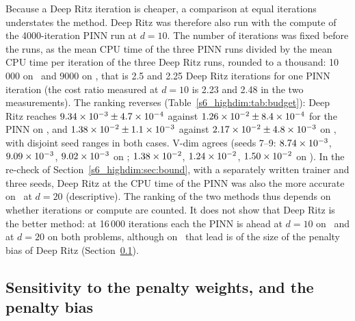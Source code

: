 Because a Deep Ritz iteration is cheaper, a comparison at equal iterations understates the
method. Deep Ritz was therefore also run with the compute of the 4000-iteration PINN run
at $d=10$.
The number of iterations was fixed before the runs, as the mean CPU time of the three PINN runs
divided by the mean CPU time per iteration of the three Deep Ritz runs, rounded to a thousand:
10\,000 on \Pone\ and 9000 on \Ptwo, that is 2.5 and 2.25 Deep Ritz iterations for one PINN
iteration (the cost ratio measured at $d=10$ is 2.23 and 2.48 in the two measurements).
The ranking reverses (Table~\ref{s6_highdim:tab:budget}): Deep Ritz reaches
$9.34\times 10^{-3}\pm4.7\times 10^{-4}$ against $1.26\times 10^{-2}\pm8.4\times 10^{-4}$ for the PINN on
\Pone, and $1.38\times 10^{-2}\pm1.1\times 10^{-3}$ against $2.17\times 10^{-2}\pm4.8\times 10^{-3}$ on \Ptwo,
with disjoint seed ranges in both cases. \textsf{V-dim} agrees (seeds 7--9:
$8.74\times 10^{-3}$, $9.09\times 10^{-3}$, $9.02\times 10^{-3}$ on \Pone; $1.38\times 10^{-2}$,
$1.24\times 10^{-2}$, $1.50\times 10^{-2}$ on \Ptwo). In the re-check of
Section~\ref{s6_highdim:sec:bound}, with a separately written trainer and three seeds, Deep Ritz
at the CPU time of the PINN was also the more accurate on \Pone\ at $d=20$ (descriptive).
The ranking of the two methods thus depends on whether iterations or compute are counted. It
does not show that Deep Ritz is the better method: at 16\,000 iterations each the PINN is ahead
at $d=10$ on \Pone\ and at $d=20$ on both problems, although on \Pone\ that lead is of the size
of the penalty bias of Deep Ritz (Section~\ref{s6_highdim:sec:weights}).

\subsection{Sensitivity to the penalty weights, and the penalty bias}\label{s6_highdim:sec:weights}

